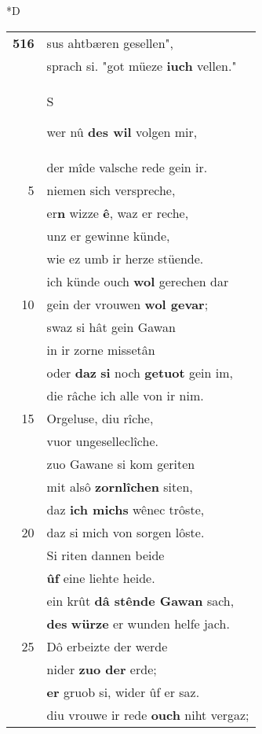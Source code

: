 \documentclass[8pt,a4paper,notitlepage]{article}
\begin{document}
\begin{table}[ht]
\begin{minipage}[t]{0.5\linewidth}
\small
\begin{center}*D
\end{center}
\begin{tabular}{rl}
\textbf{516} & sus ahtbæren gesellen",\\ 
 & sprach si. "got müeze \textbf{iuch} vellen."\\ 
 & \begin{large}S\end{large}wer nû \textbf{des wil} volgen mir,\\ 
 & der mîde valsche rede gein ir.\\ 
5 & niemen sich verspreche,\\ 
 & er\textbf{n} wizze \textbf{ê}, waz er reche,\\ 
 & unz er gewinne künde,\\ 
 & wie ez umb ir herze stüende.\\ 
 & ich künde ouch \textbf{wol} gerechen dar\\ 
10 & gein der vrouwen \textbf{wol gevar};\\ 
 & swaz si hât gein Gawan\\ 
 & in ir zorne missetân\\ 
 & oder \textbf{daz} \textbf{si} noch \textbf{getuot} gein im,\\ 
 & die râche ich alle von ir nim.\\ 
15 & Orgeluse, diu rîche,\\ 
 & vuor ungeselleclîche.\\ 
 & zuo Gawane si kom geriten\\ 
 & mit alsô \textbf{zornlîchen} siten,\\ 
 & daz \textbf{ich michs} wênec trôste,\\ 
20 & daz si mich von sorgen lôste.\\ 
 & Si riten dannen beide\\ 
 & \textbf{ûf} eine liehte heide.\\ 
 & ein krût \textbf{dâ stênde Gawan} sach,\\ 
 & \textbf{des} \textbf{würze} er wunden helfe jach.\\ 
25 & Dô erbeizte der werde\\ 
 & nider \textbf{zuo der} erde;\\ 
 & \textbf{er} gruob si, wider ûf er saz.\\ 
 & diu vrouwe ir rede \textbf{ouch} niht vergaz;\\ 

\end{tabular}
\end{minipage}
\end{table}
\end{document}
